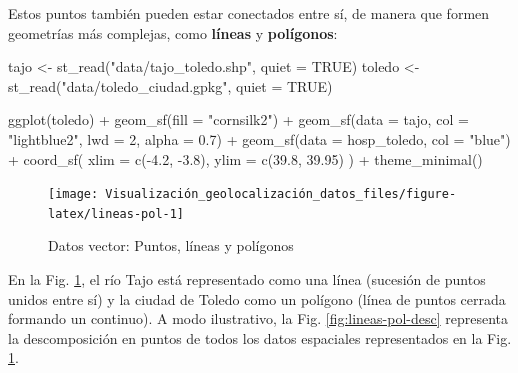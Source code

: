 \documentclass[
]{report}
\newenvironment{Shaded}{\begin{snugshade}}{\end{snugshade}}
\newcommand{\AttributeTok}[1]{\textcolor[rgb]{0.77,0.63,0.00}{#1}}
\newcommand{\ConstantTok}[1]{\textcolor[rgb]{0.00,0.00,0.00}{#1}}
\newcommand{\DecValTok}[1]{\textcolor[rgb]{0.00,0.00,0.81}{#1}}
\newcommand{\FloatTok}[1]{\textcolor[rgb]{0.00,0.00,0.81}{#1}}
\newcommand{\FunctionTok}[1]{\textcolor[rgb]{0.00,0.00,0.00}{#1}}
\newcommand{\NormalTok}[1]{#1}
\newcommand{\OtherTok}[1]{\textcolor[rgb]{0.56,0.35,0.01}{#1}}
\newcommand{\SpecialCharTok}[1]{\textcolor[rgb]{0.00,0.00,0.00}{#1}}
\newcommand{\StringTok}[1]{\textcolor[rgb]{0.31,0.60,0.02}{#1}}
\theoremstyle{definition}
\theoremstyle{definition}
\theoremstyle{definition}
\theoremstyle{definition}
\theoremstyle{remark}
\begin{document}
Estos puntos también pueden estar conectados entre sí, de manera que formen
geometrías más complejas, como \textbf{líneas} y \textbf{polígonos}:

\begin{Shaded}
\begin{Highlighting}[]

\NormalTok{tajo }\OtherTok{\textless{}{-}} \FunctionTok{st\_read}\NormalTok{(}\StringTok{"data/tajo\_toledo.shp"}\NormalTok{, }\AttributeTok{quiet =} \ConstantTok{TRUE}\NormalTok{)}
\NormalTok{toledo }\OtherTok{\textless{}{-}} \FunctionTok{st\_read}\NormalTok{(}\StringTok{"data/toledo\_ciudad.gpkg"}\NormalTok{, }\AttributeTok{quiet =} \ConstantTok{TRUE}\NormalTok{)}


\FunctionTok{ggplot}\NormalTok{(toledo) }\SpecialCharTok{+}
  \FunctionTok{geom\_sf}\NormalTok{(}\AttributeTok{fill =} \StringTok{"cornsilk2"}\NormalTok{) }\SpecialCharTok{+}
  \FunctionTok{geom\_sf}\NormalTok{(}\AttributeTok{data =}\NormalTok{ tajo, }\AttributeTok{col =} \StringTok{"lightblue2"}\NormalTok{, }\AttributeTok{lwd =} \DecValTok{2}\NormalTok{, }\AttributeTok{alpha =} \FloatTok{0.7}\NormalTok{) }\SpecialCharTok{+}
  \FunctionTok{geom\_sf}\NormalTok{(}\AttributeTok{data =}\NormalTok{ hosp\_toledo, }\AttributeTok{col =} \StringTok{"blue"}\NormalTok{) }\SpecialCharTok{+}
  \FunctionTok{coord\_sf}\NormalTok{(}
    \AttributeTok{xlim =} \FunctionTok{c}\NormalTok{(}\SpecialCharTok{{-}}\FloatTok{4.2}\NormalTok{, }\SpecialCharTok{{-}}\FloatTok{3.8}\NormalTok{),}
    \AttributeTok{ylim =} \FunctionTok{c}\NormalTok{(}\FloatTok{39.8}\NormalTok{, }\FloatTok{39.95}\NormalTok{)}
\NormalTok{  ) }\SpecialCharTok{+}
  \FunctionTok{theme\_minimal}\NormalTok{()}
\end{Highlighting}
\end{Shaded}

\begin{figure}

{\centering \texttt{[image: Visualización\_geolocalización\_datos\_files/figure-latex/lineas-pol-1]} 

}

\caption{Datos vector: Puntos, líneas y polígonos}\label{fig:lineas-pol}
\end{figure}

En la Fig. \ref{fig:lineas-pol}, el río Tajo está representado como una línea
(sucesión de puntos unidos entre sí) y la ciudad de Toledo como un polígono
(línea de puntos cerrada formando un continuo). A modo ilustrativo, la Fig.
\ref{fig:lineas-pol-desc} representa la descomposición en puntos de todos los
datos espaciales representados en la Fig. \ref{fig:lineas-pol}.
\end{document}
